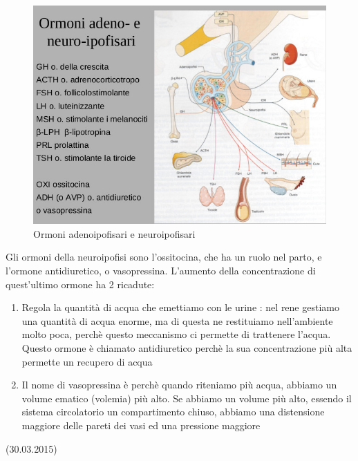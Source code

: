 \documentclass[a4paper,12pt]{article}
\begin{document}
\begin{figure}[H]
\centering
\includegraphics[scale=0.44]{immagine/an.jpg}
\caption{Ormoni adenoipofisari e neuroipofisari}
\end{figure}

Gli ormoni della neuroipofisi sono l'ossitocina, che ha un ruolo nel parto, e l'ormone antidiuretico, o vasopressina. L'aumento della concentrazione di quest'ultimo ormone ha 2 ricadute:
\begin{enumerate}
\item{Regola la quantità di acqua che emettiamo con le urine : nel rene gestiamo una quantità di acqua enorme, ma di questa ne restituiamo nell'ambiente molto poca, perchè questo meccanismo ci permette di trattenere l'acqua. Questo ormone è chiamato antidiuretico perchè la sua concentrazione più alta permette un recupero di acqua}
\item{Il nome di vasopressina è perchè quando riteniamo più acqua, abbiamo un volume ematico (volemia) più alto. Se abbiamo un volume più alto, essendo il sistema circolatorio un compartimento chiuso, abbiamo una distensione maggiore delle pareti dei vasi ed una pressione maggiore}
\end{enumerate}

(30.03.2015)
\end{document}
